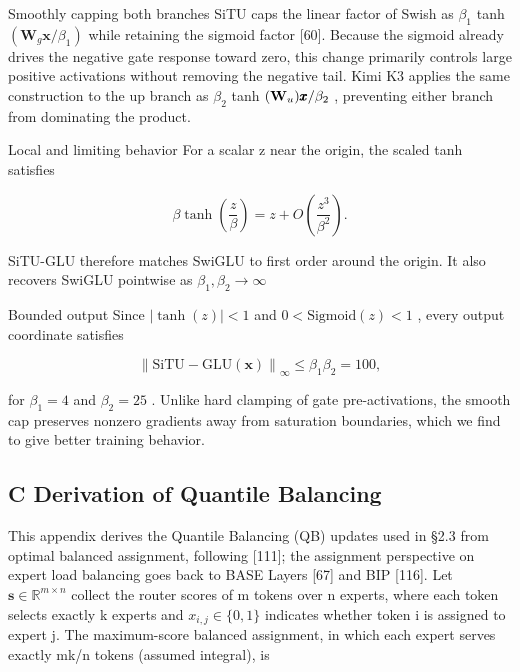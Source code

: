\documentclass[
  10
]{article}
\begin{document}
Smoothly capping both branches SiTU caps the linear factor of Swish as
\(\beta _ { 1 }\) tanh
\(( \mathbf { W } _ { g } \pmb { x } / \beta _ { 1 } )\) while retaining
the sigmoid factor {[}60{]}. Because the sigmoid already drives the
negative gate response toward zero, this change primarily controls large
positive activations without removing the negative tail. Kimi K3 applies
the same construction to the up branch as \(\beta _ { 2 }\) tanh
\({ { \left( { \bf { W } } _ { u } \right)} { \pmb x } / \beta _ { 2 }  }\)
, preventing either branch from dominating the product.

Local and limiting behavior For a scalar z near the origin, the scaled
tanh satisfies

\[
\beta \tanh \left(\frac {z}{\beta}\right) = z + O \left(\frac {z ^ {3}}{\beta^ {2}}\right).\tag{18}
\]

SiTU-GLU therefore matches SwiGLU to first order around the origin. It
also recovers SwiGLU pointwise as
\(\beta _ { 1 } , \beta _ { 2 } \to \infty\)

Bounded output Since \(| \operatorname { t a n h } ( z ) | < 1\) and
\(0 < \mathrm { S i g m o i d } ( z ) < 1\) , every output coordinate
satisfies

\[
\left\| \mathrm{SiTU-GLU} (\boldsymbol {x}) \right\| _ {\infty} \leq \beta_ {1} \beta_ {2} = 1 0 0,\tag{19}
\]

for \(\beta _ { 1 } = 4\) and \(\beta _ { 2 } = 2 5\) . Unlike hard
clamping of gate pre-activations, the smooth cap preserves nonzero
gradients away from saturation boundaries, which we find to give better
training behavior.

\subsection{C Derivation of Quantile
Balancing}\label{c-derivation-of-quantile-balancing}

This appendix derives the Quantile Balancing (QB) updates used in §2.3
from optimal balanced assignment, following {[}111{]}; the assignment
perspective on expert load balancing goes back to BASE Layers {[}67{]}
and BIP {[}116{]}. Let \(\pmb { s } \in \mathbb { R } ^ { m \times n }\)
collect the router scores of m tokens over n experts, where each token
selects exactly k experts and \(x _ { i , j } \in \{ 0 , 1 \}\)
indicates whether token i is assigned to expert j. The maximum-score
balanced assignment, in which each expert serves exactly mk/n tokens
(assumed integral), is
\end{document}
